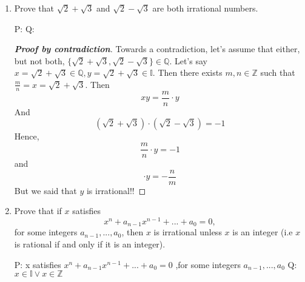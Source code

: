 \documentclass{article} %
\theoremstyle{plain}
\theoremstyle{definition}
\theoremstyle{case}
\newtheorem{case}{Case}
\begin{document}
\begin{enumerate}[label={\fbox{\textbf{Exercise \#\arabic* :}}}]
\begin{proof}[\textbf{Proof By Contrapositive}]
\begin{case}
      If $n=3k+1$, then
      This , by our definition, is not divisble by 3

    \end{case}
    \begin{case}
      $n = 3k + 2$

      If $n=3k+2$, then
      \[ n^2 = 9k^2 + 12k + 4 = 3(3k^2 + 4k + 1) + 1 \]
      But this too is not divisble by 3.
    \end{case}

\end{proof}

\renewcommand\qedsymbol{\Lightning}
\begin{proof}[\textbf{Proof by contradiction}]  Towards a contradiction,
  let's assume that \[ 3 \not| n^2 \]

  We also know that $3 | n$, so there is some integer, $k$ such that
  $n = 3k$. Squaring both sides by 
  we get $n^2 = 3^2k^2 = 3(3k^3)$, which is surely divisble by 3.  But
  we said that  $ 3 \not| n^2 $!

\end{proof} 
\renewcommand\qedsymbol{$\square$}

\newpage
\item Prove that $\sqrt{2}+\sqrt{3}$ and $\sqrt{2}-\sqrt{3}$ are both
  irrational numbers.

P: 
Q:

\renewcommand\qedsymbol{\Lightning}
\begin{proof}[\textbf{Proof by contradiction}]  Towards a contradiction,
  let's assume that either, but not both, $\{\sqrt{2}+\sqrt{3},
  \sqrt{2}-\sqrt{3} \} \in \mathbb{Q}$.  Let's say $x = 
  \sqrt{2}+\sqrt{3} \in \mathbb{Q}, y = \sqrt{2}+\sqrt{3} \in \mathbb{I}$.
  Then there exists $m,n \in \mathbb{Z} $ such that $\frac{m}{n} = x
  = \sqrt{2} + \sqrt{3}$.
  Then 
  \[  xy = \frac{m}{n} \cdot y \]
  And
  \[  (\sqrt{2}+\sqrt{3}) \cdot (\sqrt{2}-\sqrt{3})  = -1 \]
  Hence,
  \[  \frac{m}{n} \cdot y  = -1 \]
  and
  \[  \cdot y  = -\frac{n}{m}  \]
  But we said that $y$ is irrational!!

\end{proof} 
\renewcommand\qedsymbol{$\square$}
\newpage
\item Prove that if $x$ satisfies 
  \[ x^n+a_{n-1}x^{n-1}+...+a_{0}=0, \]
  for some integers $a_{n-1},...,a_0$, then $x$ is irrational unless $x$ is an integer (i.e $x$ is rational if and only if it is an integer).

P: x satisfies $x^n+a_{n-1}x^{n-1}+...+a_{0}=0$ ,for some integers $a_{n-1},...,a_0$
Q: $x \in \mathbb{I} \vee x \in \mathbb{Z} $


\end{enumerate}
\end{document}
